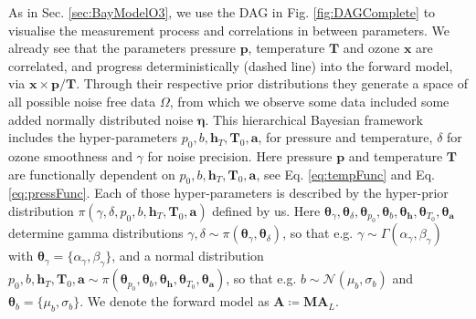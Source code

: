 As in Sec. \ref{sec:BayModelO3}, we use the DAG in Fig. \ref{fig:DAGComplete} to visualise the measurement process and correlations in between parameters.
We already see that the parameters pressure $\bm{p}$, temperature $\bm{T}$ and ozone $\bm{x}$ are correlated, and progress deterministically (dashed line) into the forward model, via $\bm{x} \times \bm{p} / \bm{T}$.
Through their respective prior distributions they generate a space of all possible noise free data $\Omega$, from which we observe some data included some added normally distributed noise $\bm{\eta}$.
This hierarchical Bayesian framework includes the hyper-parameters $p_0, b, \bm{h}_T, \bm{T}_0, \bm{a}$, for pressure and temperature, $\delta$ for ozone smoothness and $\gamma$ for noise precision.
Here pressure $\bm{p}$ and temperature $\bm{T}$ are functionally dependent on $p_0, b, \bm{h}_T, \bm{T}_0, \bm{a}$, see Eq. \ref{eq:tempFunc} and Eq. \ref{eq:pressFunc}.
Each of those hyper-parameters is described by the hyper-prior distribution $\pi(\gamma, \delta, p_0, b, \bm{h}_T, \bm{T}_0, \bm{a})$ defined by us.
Here $\bm{\theta}_{\gamma}, \bm{\theta}_{\delta},\bm{\theta}_{p_0},\bm{\theta}_{b},\bm{\theta}_{\bm{h}},\bm{\theta}_{T_0},\bm{\theta}_{\bm{a}}$ determine gamma distributions $\gamma, \delta \sim \pi(\bm{\theta}_{\gamma}, \bm{\theta}_{\delta})$, so that e.g. $\gamma \sim \Gamma(\alpha_{\gamma},\beta_{\gamma}) $ with $\bm{\theta}_{\gamma} = \{\alpha_{\gamma},\beta_{\gamma} \}$, and a normal distribution $p_0, b, \bm{h}_T, \bm{T}_0, \bm{a} \sim \pi( \bm{\theta}_{p_0},\bm{\theta}_{b},\bm{\theta}_{\bm{h}},\bm{\theta}_{T_0},\bm{\theta}_{\bm{a}})$, so that e.g. $b \sim \mathcal{N}(\mu_b, \sigma_b)$ and $\bm{\theta}_{b} = \{\mu_b, \sigma_b\}$.
We denote the forward model as $\bm{A} \coloneqq \bm{M} \bm{A}_L$.

